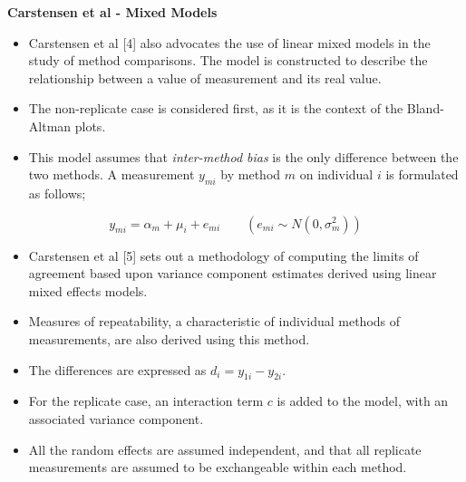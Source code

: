 \documentclass{report}
\begin{document}
%
\textbf{Carstensen et al - Mixed Models}
\begin{itemize}
	\item Carstensen et al [4] also advocates the use of linear mixed models in
	the study of method comparisons. The model is constructed to
	describe the relationship between a value of measurement and its
	real value. 
	
	\item The non-replicate case is considered first, as it is
	the context of the Bland-Altman plots. 
	\item This model assumes that
	\textit{inter-method bias} is the only difference between the two methods.
	A measurement $y_{mi}$ by method $m$ on individual $i$ is
	formulated as follows;
\end{itemize}

\begin{equation}
	y_{mi}  = \alpha_{m} + \mu_{i} + e_{mi} \qquad ( e_{mi} \sim
	N(0,\sigma^{2}_{m}))
\end{equation}



%
\begin{itemize}
	\item Carstensen et al [5] sets out a methodology of computing the limits of
	agreement based upon variance component estimates derived using
	linear mixed effects models. 
	\item Measures of repeatability, a
	characteristic of individual methods of measurements, are also
	derived using this method.
\end{itemize}


%
\large
\begin{itemize}
	\item The differences are expressed as $d_{i} = y_{1i} - y_{2i}$.
	\item For the
	replicate case, an interaction term $c$ is added to the model,
	with an associated variance component. 
	\item All the random effects are
	assumed independent, and that all replicate measurements are
	assumed to be exchangeable within each method.
\end{itemize}
\end{document}
